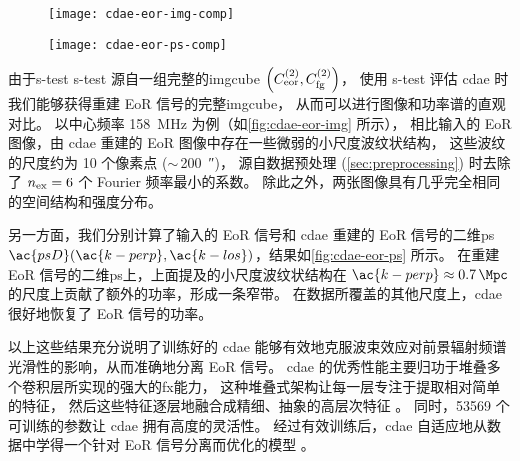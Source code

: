\begin{figure}[htp]
  \centering
  \texttt{[image: cdae-eor-img-comp]}
  \label{fig:cdae-eor-img}
\end{figure}

\begin{figure}[htp]
  \centering
  \texttt{[image: cdae-eor-ps-comp]}
  \label{fig:cdae-eor-ps}
\end{figure}

由于\acl{s-test} \ac{s-test} 源自一组完整的\ac{imgcube}
$\left( C_{\mathrm{eor}}^{(2)}, C_{\mathrm{fg}}^{(2)} \right)$，
使用 \ac{s-test} 评估 \ac{cdae} 时我们能够获得重建 EoR 信号的完整\ac{imgcube}，
从而可以进行图像和功率谱的直观对比。
以中心频率 \SI{158}{\MHz} 为例（如\autoref{fig:cdae-eor-img} 所示），
相比输入的 EoR 图像，由 \ac{cdae} 重建的 EoR 图像中存在一些微弱的小尺度波纹状结构，
这些波纹的尺度约为 10 个像素点 ($\sim$\,\SI{200}{\arcsecond})，
源自数据预处理 (\autoref{sec:preprocessing}) 时去除了 $n_{\mathrm{ex}} = 6$
个 Fourier 频率最小的系数。
除此之外，两张图像具有几乎完全相同的空间结构和强度分布。

另一方面，我们分别计算了输入的 EoR 信号和 \ac{cdae} 重建的 EoR 信号的二维\ac{ps}
$\ac{psD}(\ac{k-perp}, \ac{k-los})$，结果如\autoref{fig:cdae-eor-ps} 所示。
在重建 EoR 信号的二维\ac{ps}上，上面提及的小尺度波纹状结构在
$\ac{k-perp} \approx \SI{0.7}{\per\Mpc}$ 的尺度上贡献了额外的功率，形成一条窄带。
在数据所覆盖的其他尺度上，\ac{cdae} 很好地恢复了 EoR 信号的功率。

以上这些结果充分说明了训练好的 \ac{cdae}
能够有效地克服波束效应对前景辐射频谱光滑性的影响，从而准确地分离 EoR 信号。
\ac{cdae} 的优秀性能主要归功于堆叠多个卷积层所实现的强大的\ac{fx}能力，
这种堆叠式架构让每一层专注于提取相对简单的特征，
然后这些特征逐层地融合成精细、抽象的高层次特征 \cite{leCun2015}。
同时，\num{53569} 个可训练的参数让 \ac{cdae} 拥有高度的灵活性。
经过有效训练后，\ac{cdae} 自适应地从数据中学得一个针对 EoR 信号分离而优化的模型
\cite{domingos2012}。

